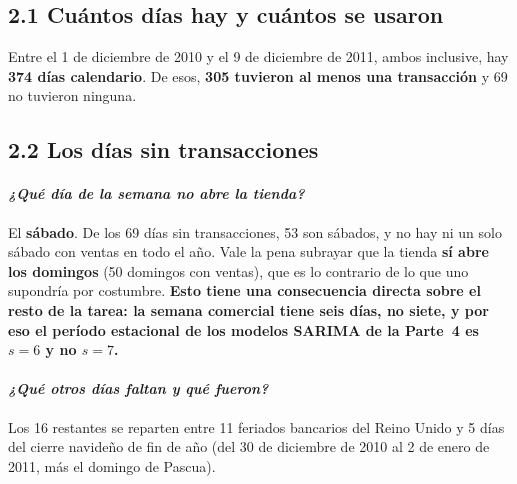 \documentclass[11pt]{article}
\begin{document}


\subsection{2.1 Cu\'antos d\'ias hay y cu\'antos se usaron}

Entre el 1 de diciembre de 2010 y el 9 de diciembre de 2011, ambos
inclusive, hay \textbf{\num{374} d\'ias calendario}. De esos,
\textbf{\num{305} tuvieron al menos una transacci\'on} y \num{69} no
tuvieron ninguna.

\subsection{2.2 Los d\'ias sin transacciones}

\paragraph{{\normalfont\itshape ¿Qu\'e d\'ia de la semana no abre la
tienda?}} El \textbf{s\'abado}. De los \num{69} d\'ias sin transacciones,
\num{53} son s\'abados, y no hay ni un solo s\'abado con ventas en todo el
a\~no. Vale la pena subrayar que la tienda \textbf{s\'i abre los domingos}
(\num{50} domingos con ventas), que es lo contrario de lo que uno
supondr\'ia por costumbre. \textbf{Esto tiene una consecuencia directa sobre
el resto de la tarea: la semana comercial tiene seis d\'ias, no siete, y por
eso el per\'iodo estacional de los modelos SARIMA de la Parte~4 es $s=6$ y
no $s=7$.}

\paragraph{{\normalfont\itshape ¿Qu\'e otros d\'ias faltan y qu\'e
fueron?}} Los \num{16} restantes se reparten entre \num{11} feriados
bancarios del Reino Unido y \num{5} d\'ias del cierre navide\~no de fin de
a\~no (del 30 de diciembre de 2010 al 2 de enero de 2011, m\'as el domingo
de Pascua).


\end{document}
